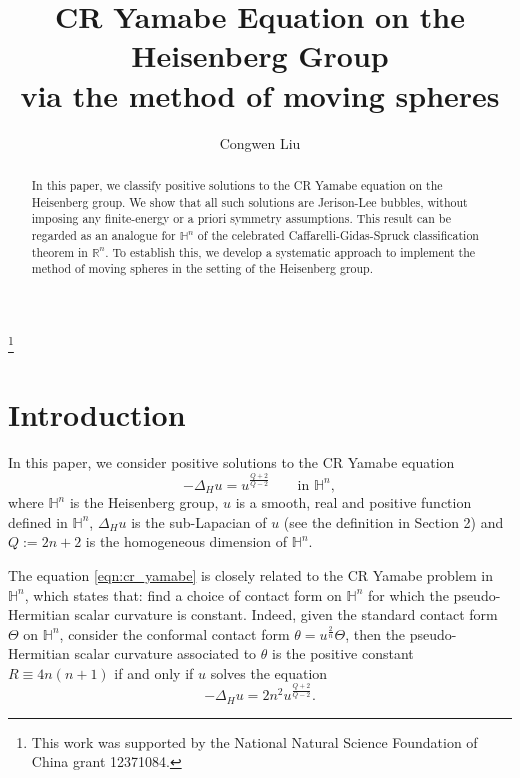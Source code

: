 \documentclass[reqno]{amsart}
\theoremstyle{definition}
\theoremstyle{remark}
\numberwithin{equation}{section}
\begin{document}
\title[CR Yamabe equation on the Heisenberg group]{CR Yamabe Equation on the Heisenberg Group\\
via the method of moving spheres}
\author{Congwen Liu}
\address{School of Mathematical Sciences, University of Science and Technology of China, Hefei, Anhui 230026, China}
\thanks{
This work was supported by the National Natural Science Foundation of China grant 12371084.}



\date{}

\begin{abstract}
In this paper, we classify positive solutions to the CR Yamabe equation on the Heisenberg group. We show that all such solutions are Jerison-Lee bubbles, without imposing any finite-energy or a priori symmetry assumptions.
This result can be regarded as an analogue for $\mathbb{H}^n$ of the celebrated Caffarelli-Gidas-Spruck classification theorem in $\mathbb{R}^n$. To establish this, we develop a systematic approach to implement the method of moving spheres in the setting of the Heisenberg group.
\end{abstract}

\maketitle

\section{Introduction}
\label{ch:intro}

In this paper,  we consider positive solutions to the CR Yamabe equation
\begin{equation} \label{eqn:cr_yamabe}
-\Delta_{\! H} u = u^{\frac{Q+2}{Q-2}} \qquad \text{in } \mathbb{H}^n,
\end{equation}
where $\mathbb{H}^n$ is the Heisenberg group,  $u$ is a smooth, real and positive function defined in $\mathbb{H}^n$,  $\Delta_{\! H} u$ is the sub-Lapacian of $u$ (see the definition in Section 2) and
$Q:=2n+2$ is the homogeneous dimension of $\mathbb{H}^n$.

The equation \eqref{eqn:cr_yamabe} is closely related to the CR Yamabe problem in $\mathbb{H}^n$,
which states that: find a choice of contact form on $\mathbb{H}^n$ for which the pseudo-Hermitian 
scalar curvature is constant. Indeed, given the standard contact form $\Theta$ on $\mathbb{H}^n$, 
consider the conformal contact form $\theta=u^{\frac{2}{n}}\Theta$, then the pseudo-Hermitian 
scalar curvature associated to $\theta$ is the positive constant $R\equiv 4n(n+1)$ if and only if 
$u$ solves the equation
\begin{equation}\label{eqn:cr_yamabe2}
-\Delta_{\! H} u = 2n^2u^{\frac{Q+2}{Q-2}}. 
\end{equation}
\end{document}
